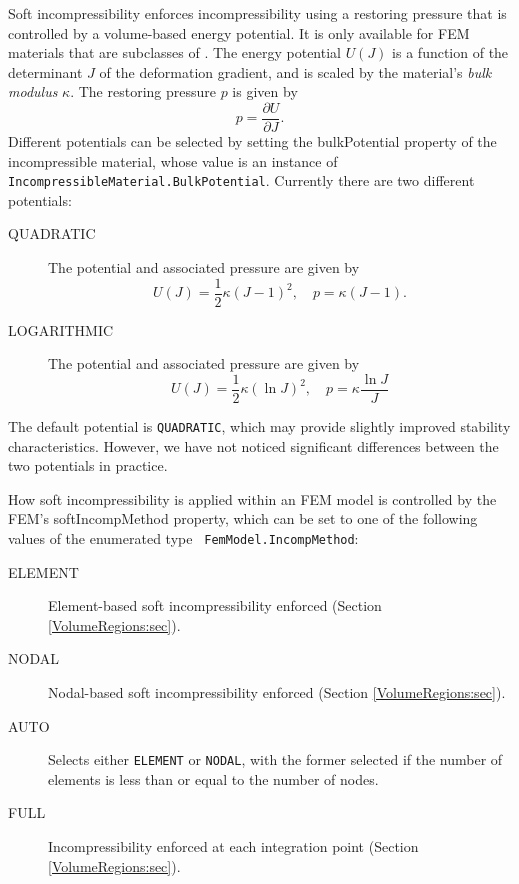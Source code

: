 Soft incompressibility enforces incompressibility using a restoring
pressure that is controlled by a volume-based energy potential. It is
only available for FEM materials that are subclasses of
.
The energy potential $U(J)$ is a function of the determinant $J$ of the
deformation gradient, and is scaled by the material's {\it bulk modulus}
$\kappa$. The restoring pressure $p$ is given by
%
\begin{equation}
p = \frac{\partial U}{\partial J}.
\end{equation}
%
Different potentials can be selected by setting the {\sf bulkPotential}
property of the incompressible material, whose value is an instance of
{\tt IncompressibleMaterial.BulkPotential}.  Currently
there are two different potentials:

\begin{description}

\item[QUADRATIC] The potential and associated pressure
are given by
%
\begin{equation}
U(J) = \frac{1}{2}\kappa (J - 1)^2, \quad p = \kappa (J - 1).
\end{equation}
%

\item[LOGARITHMIC]
The potential and associated pressure
are given by
%
\begin{equation}
U(J) = \frac{1}{2}\kappa (\ln J)^2, \quad p = \kappa \frac{\ln J}{J}
\end{equation}
%

\end{description}

The default potential is {\tt QUADRATIC}, which may provide slightly
improved stability characteristics.  However, we have not noticed
significant differences between the two potentials in practice.

How soft incompressibility is applied within an FEM model is controlled
by the FEM's {\sf softIncompMethod} property, which can be set to one
of the following values of the enumerated type {\tt
FemModel.IncompMethod}:

\begin{description}

\item[ELEMENT] Element-based soft incompressibility enforced
(Section \ref{VolumeRegions:sec}).

\item[NODAL] Nodal-based soft incompressibility enforced
(Section \ref{VolumeRegions:sec}).

\item[AUTO] Selects either {\tt ELEMENT} or {\tt NODAL},
with the former selected if the number of elements is less than or
equal to the number of nodes.

\item[FULL] Incompressibility enforced at each integration point
(Section \ref{VolumeRegions:sec}).

\end{description}

